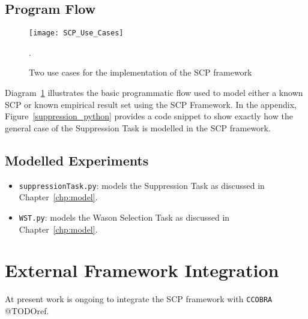 \subsection{Program Flow}
\begin{figure}
\centering \texttt{[image: SCP\_Use\_Cases]}
\caption{Two use cases for the implementation of the SCP framework}.
\label{fig:SCP_Use_Cases}
\end{figure}



Diagram~\ref{fig:SCP_Use_Cases} illustrates the basic programmatic flow used to model either a known SCP or known empirical result set using the SCP Framework. In the appendix, Figure~\ref{suppression_python} provides a code snippet to show exactly how the general case of the Suppression Task is modelled in the SCP framework.



\subsection{Modelled Experiments}
\begin{itemize}
\item \texttt{suppressionTask.py}: models the Suppression Task as discussed in Chapter~\ref{chp:model}.
\item \texttt{WST.py}: models the Wason Selection Task as discussed in Chapter~\ref{chp:model}.
\end{itemize}

\section{External Framework Integration}
At present work is ongoing to integrate the SCP framework with \texttt{CCOBRA} @TODOref.













